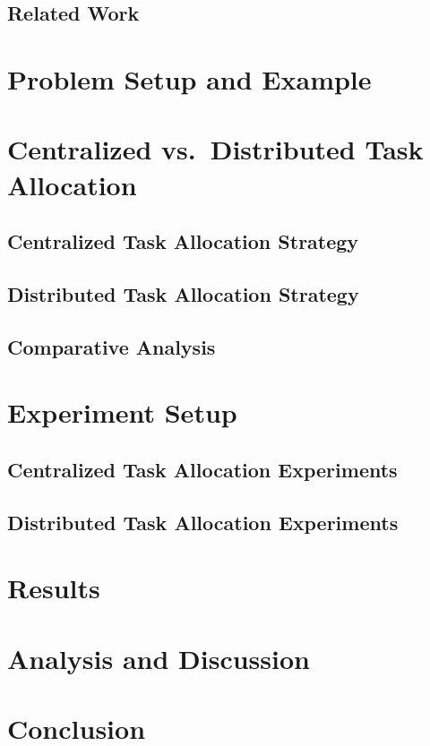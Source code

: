 \documentclass[11pt, onecolumn, compsoc, letterpaper]{article}
\begin{document}
\subsection{Related Work}

\section{Problem Setup and Example}
\section{Centralized vs.~Distributed Task Allocation}
\subsection{Centralized Task Allocation Strategy}
\subsection{Distributed Task Allocation Strategy}
\subsection{Comparative Analysis}
\section{Experiment Setup}
\subsection{Centralized Task Allocation Experiments}
\subsection{Distributed Task Allocation Experiments}
\section{Results}
\section{Analysis and Discussion}
\section{Conclusion}
\end{document}

